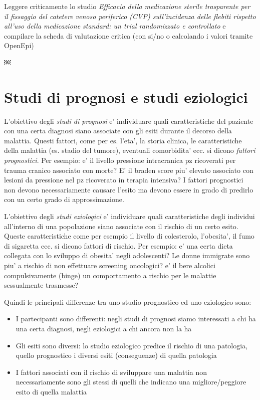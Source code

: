 \documentclass[]{book}
\begin{document}
Leggere criticamente lo studio \emph{Efficacia della medicazione sterile trasparente per il fissaggio del catetere venoso periferico (CVP) sull'incidenza delle flebiti rispetto all'uso della medicazione standard: un trial randomizzato e controllato} e compilare la scheda di valutazione critica (con si/no o calcolando i valori tramite OpenEpi)

￼

\hypertarget{studi-di-prognosi-e-studi-eziologici}{%
\chapter{Studi di prognosi e studi eziologici}\label{studi-di-prognosi-e-studi-eziologici}}

L'obiettivo degli \emph{studi di prognosi} e' individuare quali caratteristiche del paziente con una certa diagnosi siano associate con gli esiti durante il decorso della malattia. Questi fattori, come per es. l'eta', la storia clinica, le caratteristiche della malattia (es. stadio del tumore), eventuali comorbidita' ecc. si dicono \emph{fattori prognostici}. Per esempio: e' il livello pressione intracranica pz ricoverati per trauma cranico associato con morte? E' il braden score piu' elevato associato con lesioni da pressione nel pz ricoverato in terapia intensiva? I fattori prognostici non devono necessariamente causare l'esito ma devono essere in grado di predirlo con un certo grado di approssimazione.

L'obiettivo degli \emph{studi eziologici} e' individuare quali caratteristiche degli individui all'interno di una popolazione siano associate con il rischio di un certo esito. Queste caratteristiche come per esempio il livello di colesterolo, l'obesita', il fumo di sigaretta ecc. si dicono fattori di rischio. Per esempio: e' una certa dieta collegata con lo sviluppo di obesita' negli adolescenti? Le donne immigrate sono piu' a rischio di non effettuare screening oncologici? e' il bere alcolici compulsivamente (binge) un comportamento a rischio per le malattie sessualmente trasmesse?

Quindi le principali differenze tra uno studio prognostico ed uno eziologico sono:

\begin{itemize}
\item
  I partecipanti sono differenti: negli studi di prognosi siamo interessati a chi ha una certa diagnosi, negli eziologici a chi ancora non la ha
\item
  Gli esiti sono diversi: lo studio eziologico predice il rischio di una patologia, quello prognostico i diversi esiti (conseguenze) di quella patologia
\item
  I fattori associati con il rischio di sviluppare una malattia non necessariamente sono gli stessi di quelli che indicano una migliore/peggiore esito di quella malattia
\end{itemize}
\end{document}
